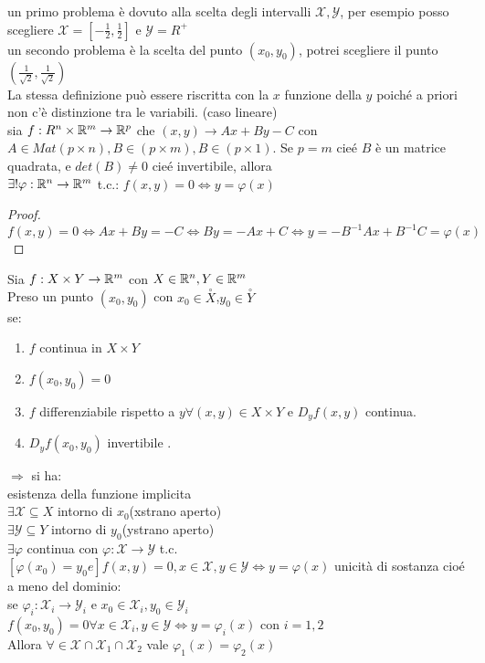 	un primo problema è dovuto alla scelta degli intervalli $\mathcal{X},\mathcal{Y}$, per esempio posso scegliere $\mathcal{X}=[-\frac{1}{2},\frac{1}{2}]$ e $\mathcal{Y}=R^+$\\
	un secondo problema è la scelta del punto $(x_0,y_0)$, potrei scegliere il punto $(\frac{1}{\sqrt{2}},\frac{1}{\sqrt{2}})$\\
\observation
La stessa definizione può essere riscritta con la $x$ funzione della $y$ poiché a priori non c'è distinzione tra le variabili.
\proposition (caso lineare)\\
sia $f:R^n\times \mathbb{R}^m\rightarrow \mathbb{R}^p$ che $(x,y)\rightarrow Ax+By-C$ con $A\in Mat(p \times n), B\in (p \times m), B\in (p \times 1)$. Se $p=m$ cie\'e $B$ è un matrice quadrata, e $det(B)\ne 0$ cie\'e invertibile, allora\\
$\exists !\varphi : \mathbb{R}^n\rightarrow \mathbb{R}^m$ t.c.: $f(x,y)=0 \Leftrightarrow y=\varphi(x)$
\begin{proof}
	$f(x,y)=0\Leftrightarrow Ax+By=-C\Leftrightarrow By=-Ax+C\Leftrightarrow y=-B^{-1}Ax+B^{-1}C = \varphi(x)$
\end{proof}
\proposition
Sia $f:X\times Y\rightarrow \mathbb{R}^m$ con $X\in \mathbb{R}^n, Y\in \mathbb{R}^m$\\
Preso un punto $(x_0,y_0)$ con $x_0\in \overset{\circ}{X}$,$y_0\in \overset{\circ}{Y}$\\
se:
\begin{enumerate}
	\item $f$ continua in $X\times Y$
	\item $f(x_0,y_0)=0$
	\item $f$ differenziabile rispetto a $y \forall (x,y)\in X\times Y$ e $D_yf(x,y)$ continua.
	\item $D_yf(x_0,y_0)$ invertibile .
\end{enumerate}
$\Rightarrow $ si ha:\\
esistenza della funzione implicita\\
$\exists \mathcal{X}\subseteq X$ intorno di $x_0$(xstrano aperto)\\
$\exists \mathcal{Y}\subseteq Y$ intorno di $y_0$(ystrano aperto)\\
$\exists\varphi$ continua con $\varphi:\mathcal{X}\rightarrow\mathcal{Y}$ t.c. $[\varphi (x_0)=y_0 e] f(x,y)=0, x\in\mathcal{X},y\in\mathcal{Y} \Leftrightarrow y=\varphi(x)$
unicità di sostanza cio\'e a meno del dominio:\\
se $\varphi_i:\mathcal{X}_i\rightarrow\mathcal{Y}_i$ e $x_0\in\mathcal{X}_i,y_0\in\mathcal{Y}_i$\\
$f(x_0,y_0)=0 \forall x\in\mathcal{X}_i, y\in \mathcal{Y}\Leftrightarrow y=\varphi_i(x)$ con $i=1,2$\\
Allora $\forall\in\mathcal{X}\cap\mathcal{X}_1\cap\mathcal{X}_2$ vale $\varphi_1(x)=\varphi_2(x)$

